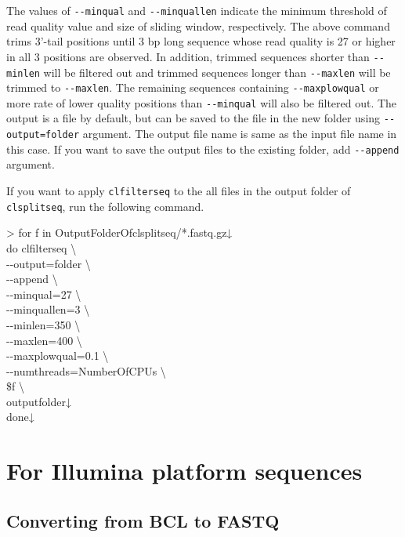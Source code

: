 \documentclass[titlepage,10pt,a4paper,english]{jsbook}
\newenvironment{cmd}{\begin{oframed}\raggedright\ttfamily\footnotesize\setlength{\baselineskip}{1.4em}}{\end{oframed}\vspace{-1em}}
\begin{document}
The values of \texttt{{-}{-}minqual} and \texttt{{-}{-}minquallen} indicate the minimum threshold of read quality value and size of sliding window, respectively.
The above command trims 3'-tail positions until 3 bp long sequence whose read quality is 27 or higher in all 3 positions are observed.
In addition, trimmed sequences shorter than \texttt{{-}{-}minlen} will be filtered out and trimmed sequences longer than \texttt{{-}{-}maxlen} will be trimmed to \texttt{{-}{-}maxlen}.
The remaining sequences containing \texttt{{-}{-}maxplowqual} or more rate of lower quality positions than \texttt{{-}{-}minqual} will also be filtered out.
The output is a file by default, but can be saved to the file in the new folder using \texttt{{-}{-}output=folder} argument.
The output file name is same as the input file name in this case.
If you want to save the output files to the existing folder, add \texttt{{-}{-}append} argument.

If you want to apply \texttt{clfilterseq} to the all files in the output folder of \texttt{clsplitseq}, run the following command.

\begin{cmd}
{\textgreater} for f in OutputFolderOfclsplitseq/*.fastq.gz↓\\
do clfilterseq {\textbackslash}\\
{-}{-}output=folder {\textbackslash}\\
{-}{-}append {\textbackslash}\\
{-}{-}minqual=27 {\textbackslash}\\
{-}{-}minquallen=3 {\textbackslash}\\
{-}{-}minlen=350 {\textbackslash}\\
{-}{-}maxlen=400 {\textbackslash}\\
{-}{-}maxplowqual=0.1 {\textbackslash}\\
{-}{-}numthreads=NumberOfCPUs {\textbackslash}\\
\$f {\textbackslash}\\
outputfolder↓\\
done↓
\end{cmd}

\section{For Illumina platform sequences}

\subsection{Converting from BCL to FASTQ}
\end{document}
